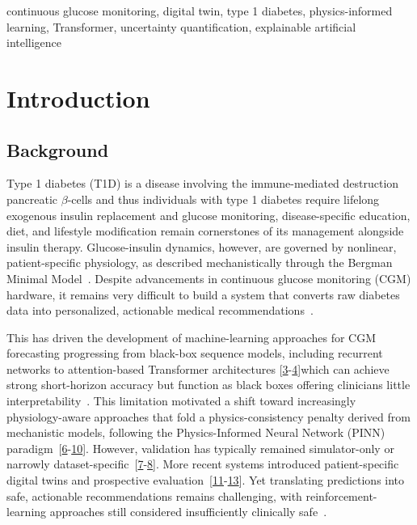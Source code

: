 \documentclass[journal]{IEEEtran}
\begin{document}
\begin{IEEEkeywords}
continuous glucose monitoring, digital twin, type 1 diabetes, physics-informed learning, Transformer, uncertainty quantification, explainable artificial intelligence
\end{IEEEkeywords}

\section{Introduction}

\subsection{Background}

Type 1 diabetes (T1D) is a disease involving the immune-mediated destruction pancreatic $\beta$-cells and thus individuals with type 1 diabetes require lifelong exogenous insulin replacement and glucose monitoring, disease-specific education, diet, and lifestyle modification remain cornerstones of its management alongside insulin therapy. Glucose-insulin dynamics, however, are governed by nonlinear, patient-specific physiology, as described mechanistically through the Bergman Minimal Model~\cite{ref1}. Despite advancements in continuous glucose monitoring (CGM) hardware, it remains very difficult to build a system that converts raw diabetes data into personalized, actionable medical recommendations~\cite{ref2}.

This has driven the development of machine-learning approaches for CGM forecasting progressing from black-box sequence models, including recurrent networks to attention-based Transformer architectures
[\hyperref[ref3label]{3}-\hyperref[ref4label]{4}]which can achieve strong short-horizon accuracy but function as black boxes offering clinicians little interpretability~\cite{ref3,ref5}. This limitation motivated a shift toward increasingly physiology-aware approaches that fold a physics-consistency penalty derived from mechanistic models, following the Physics-Informed Neural Network (PINN) paradigm~[\hyperref[ref6label]{6}-\hyperref[ref10label]{10}]. However, validation has typically remained simulator-only or narrowly dataset-specific~[\hyperref[ref7label]{7}-\hyperref[ref8label]{8}]. More recent systems introduced patient-specific digital twins and prospective evaluation~[\hyperref[ref11label]{11}-\hyperref[ref13label]{13}]. Yet translating predictions into safe, actionable recommendations remains challenging, with reinforcement-learning approaches still considered insufficiently clinically safe~\cite{ref14}.
\end{document}
